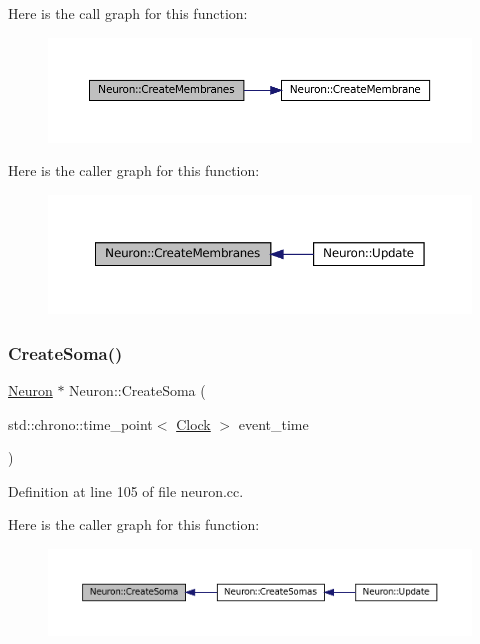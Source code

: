 Here is the call graph for this function\+:\nopagebreak
\begin{figure}[H]
\begin{center}
\leavevmode
\includegraphics[width=350pt]{class_neuron_a5f6f460c6a98319a05c3ba06d14e6f60_cgraph}
\end{center}
\end{figure}
Here is the caller graph for this function\+:\nopagebreak
\begin{figure}[H]
\begin{center}
\leavevmode
\includegraphics[width=350pt]{class_neuron_a5f6f460c6a98319a05c3ba06d14e6f60_icgraph}
\end{center}
\end{figure}
\mbox{\label{class_neuron_a32593a869b25c778c1856c36704f49cf}} 
\subsubsection{\texorpdfstring{Create\+Soma()}{CreateSoma()}}
{\footnotesize\ttfamily \mbox{\hyperlink{class_neuron}{Neuron}} $\ast$ Neuron\+::\+Create\+Soma (\begin{DoxyParamCaption}\item[{std\+::chrono\+::time\+\_\+point$<$ \mbox{\hyperlink{universe_8h_a0ef8d951d1ca5ab3cfaf7ab4c7a6fd80}{Clock}} $>$}]{event\+\_\+time }\end{DoxyParamCaption})}



Definition at line 105 of file neuron.\+cc.

Here is the caller graph for this function\+:\nopagebreak
\begin{figure}[H]
\begin{center}
\leavevmode
\includegraphics[width=350pt]{class_neuron_a32593a869b25c778c1856c36704f49cf_icgraph}
\end{center}
\end{figure}
\mbox{\label{class_neuron_a2016d83b02bfe9e5548d5c24ef31dded}} 
